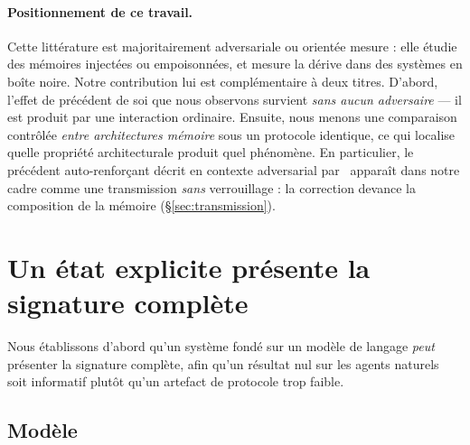 \documentclass[11pt]{article}
\begin{document}
\paragraph{Positionnement de ce travail.}
Cette littérature est majoritairement adversariale ou orientée mesure : elle étudie
des mémoires injectées ou empoisonnées, et mesure la dérive dans des systèmes en boîte
noire. Notre contribution lui est complémentaire à deux titres. D'abord, l'effet de
précédent de soi que nous observons survient \emph{sans aucun adversaire} --- il est
produit par une interaction ordinaire. Ensuite, nous menons une comparaison contrôlée
\emph{entre architectures mémoire} sous un protocole identique, ce qui localise quelle
propriété architecturale produit quel phénomène. En particulier, le précédent
auto-renforçant décrit en contexte adversarial par~\cite{wei2025amemguard} apparaît
dans notre cadre comme une transmission \emph{sans} verrouillage : la correction
devance la composition de la mémoire (\S\ref{sec:transmission}).

\section{Un état explicite présente la signature complète}
\label{sec:engineered}

Nous établissons d'abord qu'un système fondé sur un modèle de langage \emph{peut}
présenter la signature complète, afin qu'un résultat nul sur les agents naturels soit
informatif plutôt qu'un artefact de protocole trop faible.

\subsection{Modèle}
\end{document}
